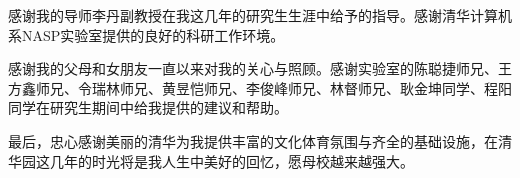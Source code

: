 \begin{acknowledgement}
感谢我的导师李丹副教授在我这几年的研究生生涯中给予的指导。感谢清华计算机系NASP实验室提供的良好的科研工作环境。

感谢我的父母和女朋友一直以来对我的关心与照顾。感谢实验室的陈聪捷师兄、王方鑫师兄、令瑞林师兄、黄昱恺师兄、李俊峰师兄、林督师兄、耿金坤同学、程阳同学在研究生期间中给我提供的建议和帮助。

最后，忠心感谢美丽的清华为我提供丰富的文化体育氛围与齐全的基础设施，在清华园这几年的时光将是我人生中美好的回忆，愿母校越来越强大。

\end{acknowledgement}
